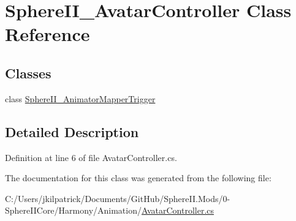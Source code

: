 \hypertarget{class_sphere_i_i___avatar_controller}{}\section{Sphere\+I\+I\+\_\+\+Avatar\+Controller Class Reference}
\label{class_sphere_i_i___avatar_controller}
\subsection*{Classes}
\begin{DoxyCompactItemize}
\item 
class \mbox{\hyperlink{class_sphere_i_i___avatar_controller_1_1_sphere_i_i___animator_mapper_trigger}{Sphere\+I\+I\+\_\+\+Animator\+Mapper\+Trigger}}
\end{DoxyCompactItemize}


\subsection{Detailed Description}


Definition at line 6 of file Avatar\+Controller.\+cs.



The documentation for this class was generated from the following file\+:\begin{DoxyCompactItemize}
\item 
C\+:/\+Users/jkilpatrick/\+Documents/\+Git\+Hub/\+Sphere\+I\+I.\+Mods/0-\/\+Sphere\+I\+I\+Core/\+Harmony/\+Animation/\mbox{\hyperlink{_avatar_controller_8cs}{Avatar\+Controller.\+cs}}\end{DoxyCompactItemize}
